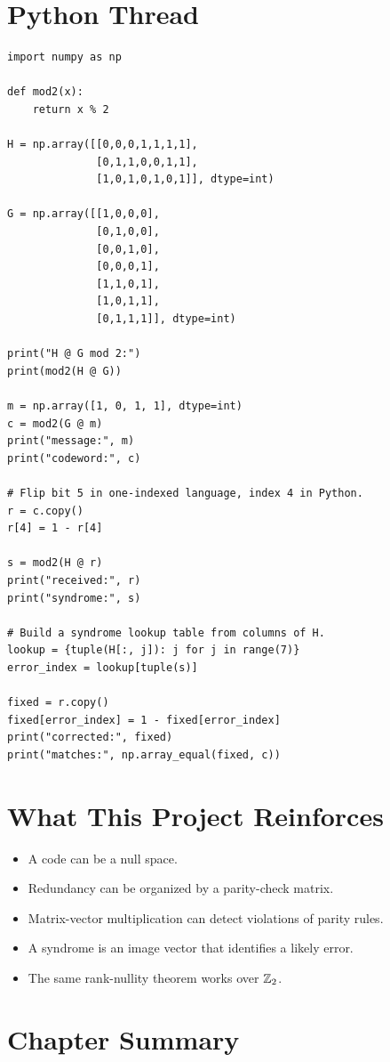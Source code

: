 \section{Python Thread}

\begin{lstlisting}
import numpy as np

def mod2(x):
    return x % 2

H = np.array([[0,0,0,1,1,1,1],
              [0,1,1,0,0,1,1],
              [1,0,1,0,1,0,1]], dtype=int)

G = np.array([[1,0,0,0],
              [0,1,0,0],
              [0,0,1,0],
              [0,0,0,1],
              [1,1,0,1],
              [1,0,1,1],
              [0,1,1,1]], dtype=int)

print("H @ G mod 2:")
print(mod2(H @ G))

m = np.array([1, 0, 1, 1], dtype=int)
c = mod2(G @ m)
print("message:", m)
print("codeword:", c)

# Flip bit 5 in one-indexed language, index 4 in Python.
r = c.copy()
r[4] = 1 - r[4]

s = mod2(H @ r)
print("received:", r)
print("syndrome:", s)

# Build a syndrome lookup table from columns of H.
lookup = {tuple(H[:, j]): j for j in range(7)}
error_index = lookup[tuple(s)]

fixed = r.copy()
fixed[error_index] = 1 - fixed[error_index]
print("corrected:", fixed)
print("matches:", np.array_equal(fixed, c))
\end{lstlisting}

\section{What This Project Reinforces}

\begin{itemize}
  \item A code can be a null space.
  \item Redundancy can be organized by a parity-check matrix.
  \item Matrix-vector multiplication can detect violations of parity rules.
  \item A syndrome is an image vector that identifies a likely error.
  \item The same rank-nullity theorem works over $\mathbb{Z}_2$.
\end{itemize}

\section*{Chapter Summary}

